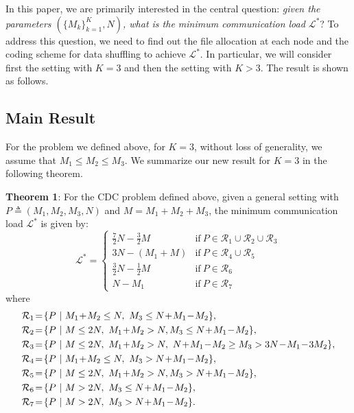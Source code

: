 \documentclass[conference]{IEEEtran}
\begin{document}
In this paper, we are primarily interested in the central question: \emph{given the parameters $(\{M_k\}_{k=1}^K,N)$, what is the minimum communication load ${\mathcal L}^*$}? To address this question, we need to find out the file allocation at each node and the coding scheme for data shuffling to achieve ${\mathcal L}^*$. In particular, we will consider first the setting with $K=3$ and then the setting with $K\!>\!3$. The result is shown as follows.


\subsection{Main Result}

For the problem we defined above, for $K=3$, without loss of generality, we assume that $M_1\leq M_2\leq M_3$. We summarize our new result for $K=3$ in the following theorem.

{\bf Theorem 1}: For the CDC problem defined above, given a general setting with $P\triangleq(M_1,M_2,M_3,N)$ and $M=M_1+M_2+M_3$, the minimum communication load ${\mathcal L}^*$ is given by:
\begin{equation}
{\mathcal L}^*=\left\{\begin{array}{ll} \frac{7}{2}N-\frac{3}{2}M& \textrm{if}~P\in \mathcal{R}_1\cup\mathcal{R}_2\cup\mathcal{R}_3\\
3N-(M_1+M)&\textrm{if}~P\in \mathcal{R}_4\cup\mathcal{R}_5\\
\frac{3}{2}N-\frac{1}{2}M&\textrm{if}~P \in \mathcal{R}_6\\
N-M_1&\textrm{if}~P \in \mathcal{R}_7 \end{array}\right.
\end{equation}
where
\begin{equation}\notag
\begin{aligned}
\mathcal{R}_1&\!=\! \{P~|~M_1\!+\!M_2\leq N,~M_3\leq N\!+\!M_1\!-\!M_2\},\\
\mathcal{R}_2&\!=\! \{P~|~M\leq 2N,~M_1\!+\!M_2> N,M_3\leq N\!+\!M_1\!-\!M_2\},\\
\mathcal{R}_3&\!=\! \{P~|~M\leq 2N,~ M_1\!+\!M_2> N,~N\!+\!M_1\!-\!M_2\geq M_3> 3N\!-\!M_1\!-\!3M_2\},\\
\mathcal{R}_4&\!=\! \{P~|~M_1\!+\!M_2\leq N,~M_3> N\!+\!M_1\!-\!M_2\},\\
\mathcal{R}_5&\!=\! \{P~|~M\leq 2N,~ M_1\!+\!M_2> N,M_3> N\!+\!M_1\!-\!M_2\},\\
\mathcal{R}_6&\!=\! \{P~|~M> 2N,~M_3\leq N\!+\!M_1\!-\!M_2\},\\
\mathcal{R}_7&\!=\! \{P~|~M> 2N,~M_3> N\!+\!M_1\!-\!M_2\}.
\end{aligned}
\end{equation}
\end{document}
